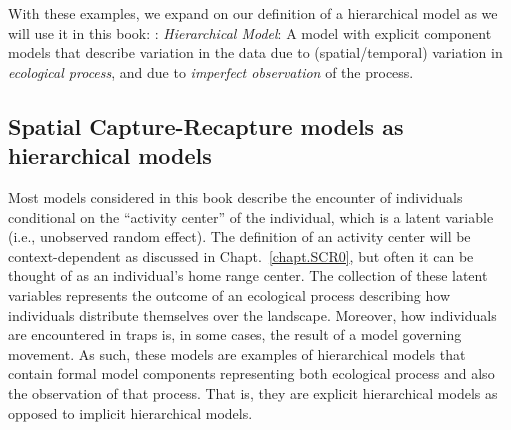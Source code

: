 With these examples,
we expand on our definition of a hierarchical model as we will use it
in this book: \newline
{: {\it Hierarchical Model}: A model with
  explicit component models that describe variation in the data due to
  (spatial/temporal) variation in {\it ecological process}, and due to
  {\it imperfect observation} of the process.
}














\subsection{Spatial Capture-Recapture models as hierarchical models}

Most models considered in this book describe the encounter of
individuals conditional on the ``activity center'' of the individual,
which is a latent variable (i.e., unobserved random effect).
The definition of an activity center will be context-dependent as
discussed in Chapt.~\ref{chapt.SCR0}, but
often it can be thought of as an individual's home range center.
The collection of these latent variables represents the outcome of an
ecological process describing how individuals distribute themselves
over the landscape. Moreover, how individuals are encountered in traps
is, in some cases, the result of a model governing movement.  As such,
these models are examples of hierarchical models that contain formal
model components representing both ecological process and also the
observation of that process. That is, they are explicit hierarchical
models \citep{royle_dorazio:2008} as opposed to implicit hierarchical
models.




